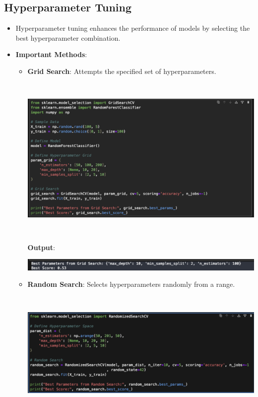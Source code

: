 \documentclass{article}
\begin{document}
\subsection{Hyperparameter Tuning}
\begin{itemize}
    \item Hyperparameter tuning enhances the performance of models by selecting the best hyperparameter combination.
    \item \textbf{Important Methods}:
    \begin{itemize}
    \item \textbf{Grid Search}: Attempts the specified set of hyperparameters.

    \includegraphics[width=14cm,height=8cm]{Grid.png}


\textbf{Output}:

\includegraphics[width=14cm,height=1
cm]{Grid_Output.png}
    \item \textbf{Random Search}: Selects hyperparameters randomly from a range.

    \includegraphics[width=14cm,height=6cm]{Random .png}



\end{itemize}
\end{itemize}
\end{document}
